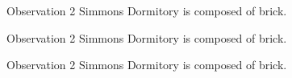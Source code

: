 \documentclass[aspectratio=1610,10pt]{beamer}
\begin{document}
\begin{frame}
   \begin{block}{Observation 2}
   Simmons Dormitory is composed of brick.
   \end{block}
\end{frame}

\begin{frame}
   \begin{alertblock}{Observation 2}
   Simmons Dormitory is composed of brick.
   \end{alertblock}
\end{frame}

\begin{frame}
   \begin{exampleblock}{Observation 2}
   Simmons Dormitory is composed of brick.
   \end{exampleblock}
\end{frame}
\end{document}
